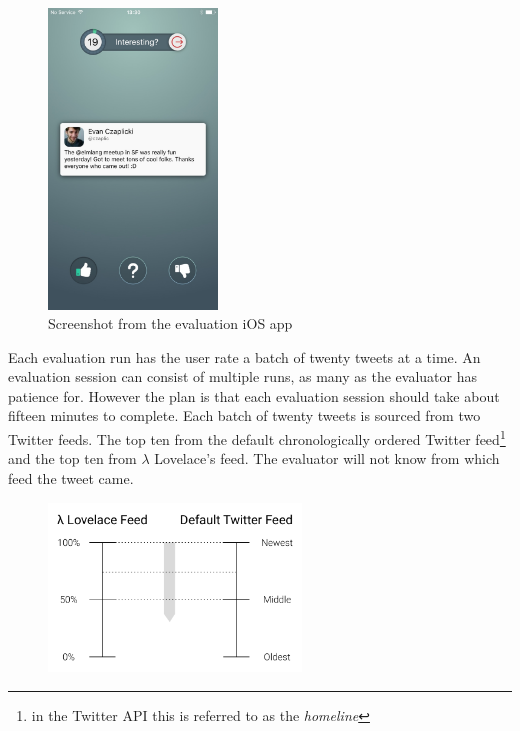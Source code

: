 \documentclass{article}
\begin{document}
\begin{figure}[H]
    \includegraphics[width=0.4\textwidth, center]{eval1}
    \caption{Screenshot from the evaluation iOS app}
\end{figure}

Each evaluation run has the user rate a batch of twenty tweets at a time. An evaluation session can consist of multiple runs, as many as the evaluator has patience for. However the plan is that each evaluation session should take about fifteen minutes to complete. Each batch of twenty tweets is sourced from two Twitter feeds. The top ten from the default chronologically ordered Twitter feed\footnote{in the Twitter API this is referred to as the \textit{homeline}} and the top ten from $\lambda$ Lovelace's feed. The evaluator will not know from which feed the tweet came.

\begin{figure}[H]
    \includegraphics[width=0.6\textwidth, center]{evaluations_1}
\end{figure}

\newpage
\end{document}
